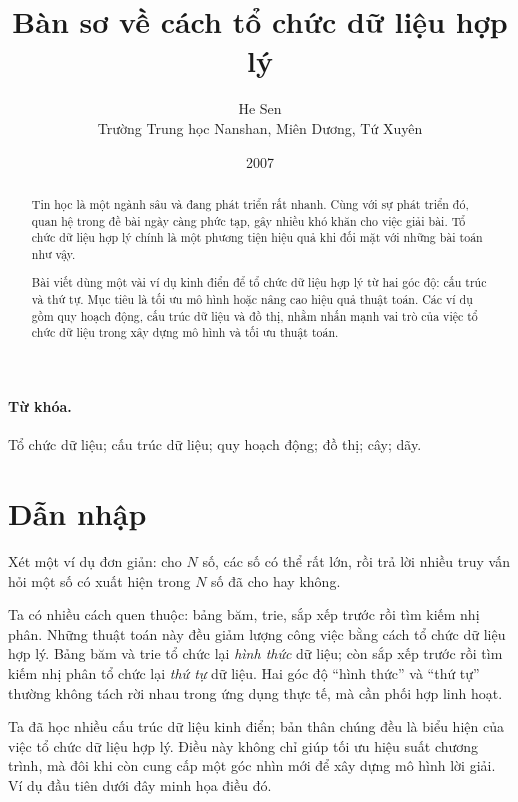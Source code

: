 \documentclass[11pt]{article}
\title{Bàn sơ về cách tổ chức dữ liệu hợp lý}
\author{He Sen\\Trường Trung học Nanshan, Miên Dương, Tứ Xuyên}
\date{2007}
\begin{document}
\maketitle


\begin{abstract}
Tin học là một ngành sâu và đang phát triển rất nhanh. Cùng với sự phát triển
đó, quan hệ trong đề bài ngày càng phức tạp, gây nhiều khó khăn cho việc giải
bài. Tổ chức dữ liệu hợp lý chính là một phương tiện hiệu quả khi đối mặt với
những bài toán như vậy.

Bài viết dùng một vài ví dụ kinh điển để tổ chức dữ liệu hợp lý từ hai góc
độ: cấu trúc và thứ tự. Mục tiêu là tối ưu mô hình hoặc nâng cao hiệu quả
thuật toán. Các ví dụ gồm quy hoạch động, cấu trúc dữ liệu và đồ thị, nhằm
nhấn mạnh vai trò của việc tổ chức dữ liệu trong xây dựng mô hình và tối ưu
thuật toán.
\end{abstract}

\paragraph{Từ khóa.}
Tổ chức dữ liệu; cấu trúc dữ liệu; quy hoạch động; đồ thị; cây; dãy.

\section{Dẫn nhập}

Xét một ví dụ đơn giản: cho \(N\) số, các số có thể rất lớn, rồi trả lời nhiều
truy vấn hỏi một số có xuất hiện trong \(N\) số đã cho hay không.

Ta có nhiều cách quen thuộc: bảng băm, trie, sắp xếp trước rồi tìm kiếm nhị
phân. Những thuật toán này đều giảm lượng công việc bằng cách tổ chức dữ liệu
hợp lý. Bảng băm và trie tổ chức lại \emph{hình thức} dữ liệu; còn sắp xếp
trước rồi tìm kiếm nhị phân tổ chức lại \emph{thứ tự} dữ liệu. Hai góc độ
``hình thức'' và ``thứ tự'' thường không tách rời nhau trong ứng dụng thực tế,
mà cần phối hợp linh hoạt.

Ta đã học nhiều cấu trúc dữ liệu kinh điển; bản thân chúng đều là biểu hiện
của việc tổ chức dữ liệu hợp lý. Điều này không chỉ giúp tối ưu hiệu suất
chương trình, mà đôi khi còn cung cấp một góc nhìn mới để xây dựng mô hình lời
giải. Ví dụ đầu tiên dưới đây minh họa điều đó.
\end{document}
